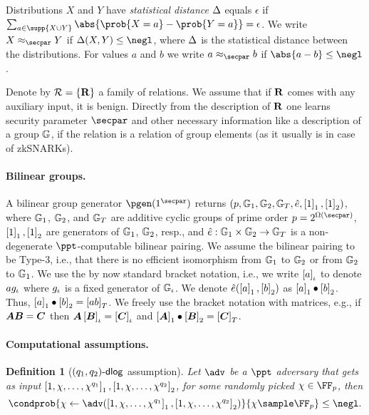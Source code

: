 \let\accentvec\vec \documentclass[runningheads,10pt]{llncs}
\def\vec#1{\mathchoice{\mbox{\boldmath$\displaystyle#1$}}
{\mbox{\boldmath$\textstyle#1$}} {\mbox{\boldmath$\scriptstyle#1$}}
{\mbox{\boldmath$\scriptscriptstyle#1$}}}
\newtheorem{definition}[theorem]{Definition}
\begin{document}
Distributions $X$ and $Y$ have \emph{statistical distance} $\Delta$ equals $\epsilon$ if $\sum_{a \in \supp{X \cup Y}} \abs{\prob{X = a} - \prob{Y = a}} = \epsilon$.
We write $X \approx_\secpar Y$ if $\SD(X, Y) \leq \negl$, where $\Delta$ is the statistical distance between the distributions.
For values $a$ and $b$ we write $a \approx_\secpar b$ if $\abs{a - b} \leq \negl$.

Denote by $\mathcal{R} = \{\mathbf{R}\}$ a family of relations. We assume that if
$\mathbf{R}$ comes with any auxiliary input, it is benign. Directly from the description of $\mathbf{R}$ one learns security parameter $\secpar$ and other necessary information like a description of a group $\mathbb{G}$, if the relation is a relation of group elements (as it usually is in case of zkSNARKs).

\paragraph{Bilinear groups.}
A bilinear group generator $\pgen (1^\secpar)$ returns $(p, \mathbb{G}_1, \mathbb{G}_2, \mathbb{G}_T, \hat{e}, \left[1\right]_{1}, \left[1\right]_{2})$, where $\mathbb{G}_1$, $\mathbb{G}_2$, and $\mathbb{G}_T$ are additive cyclic groups of prime order $p = 2^{\Omega (\secpar)}$, $\left[1\right]_{1}, \left[1\right]_{2}$ are generators of $\mathbb{G}_1$, $\mathbb{G}_2$, resp., and $\hat{e}: \mathbb{G}_1 \times \mathbb{G}_2 \to \mathbb{G}_T$ is a non-degenerate $\ppt$-computable bilinear pairing.
We assume the bilinear pairing to be Type-3, i.e., that there is no efficient isomorphism from $\mathbb{G}_1$ to $\mathbb{G}_2$ or from $\mathbb{G}_2$ to $\mathbb{G}_1$.
We use the by now standard bracket notation, i.e., we write $\left[a\right]_{\iota}$ to denote $a g_{\iota}$ where $g_{\iota}$ is a fixed generator of $\mathbb{G}_{\iota}$.
We denote $\hat{e} (\left[a\right]_{1}, \left[b\right]_{2})$ as $\left[a\right]_{1} \bullet \left[b\right]_{2}$.
Thus, $\left[a\right]_{1} \bullet \left[b\right]_{2} = \left[a b\right]_{T}$.
We freely use the bracket notation with matrices, e.g., if $\vec{A} \vec{B} = \vec{C}$ then $\vec{A} \grpgi{\vec{B}} = \grpgi{\vec{C}}$ and $\gone{\vec{A}}\bullet \gtwo{\vec{B}} = \gtar{\vec{C}}$.

\paragraph{Computational assumptions.}

\begin{definition}[$(q_1, q_2)\text{-}\mathsf{dlog}$ assumption]
	Let $\adv$ be a $\ppt$ adversary that gets as input $\left[1, \chi, \ldots, \chi^{q_1}\right]_{1}, \left[1, \chi, \ldots, \chi^{q_2}\right]_{2}$, for some randomly picked $\chi \in \FF_p$, then
	\[
		\condprob{\chi \gets \adv(\gone{1, \chi, \ldots, \chi^{q_1}}, \gtwo{1, \chi, \ldots, \chi^{q_2} })}{\chi \sample \FF_p} \leq \negl.
	\]
\end{definition}
\end{document}
